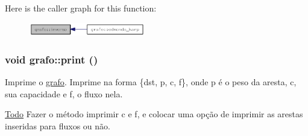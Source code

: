 Here is the caller graph for this function:\nopagebreak
\begin{figure}[H]
\begin{center}
\leavevmode
\includegraphics[width=144pt]{structgrafo_a29123b27d787f47c2bd1905594a09903_icgraph}
\end{center}
\end{figure}
\hypertarget{structgrafo_afd949f9470a970902ffa14a665c78fde}{
\subsubsection[{print}]{\setlength{\rightskip}{0pt plus 5cm}void grafo::print ()}}
\label{structgrafo_afd949f9470a970902ffa14a665c78fde}


Imprime o \hyperlink{structgrafo}{grafo}. Imprime na forma \{dst, p, c, f\}, onde p é o peso da aresta, c, sua capacidade e f, o fluxo nela.

\begin{Desc}
\item[\hyperlink{todo__todo000001}{Todo}]Fazer o método imprimir c e f, e colocar uma opção de imprimir as arestas inseridas para fluxos ou não. \end{Desc}


